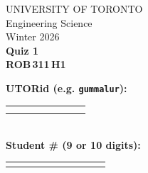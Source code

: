 \documentclass[12pt]{article}
\begin{document}
\newcommand{\spacer}{
  \vspace{5mm}\\
}

\newcommand{\hspacer}{\\
}

\noindent
\begin{minipage}{0.45\textwidth}
\large
\noindent  UNIVERSITY OF TORONTO\\
  Engineering Science\\[1.75ex]
  Winter 2026\\[1.75ex]
  \textbf{Quiz 1} \\
  \textbf{{ROB\,311\,H1}}
\end{minipage}%
\hspace{-1cm}
\begin{minipage}{0.6\textwidth}
\raggedleft
\textbf{UTORid (e.g. \texttt{gummalur}):} \\[1ex]
\begin{tabular}{|c|c|c|c|c|c|c|c|}
  \hline
  \hspace{1.2em}\; & \hspace{1.2em}\; & \hspace{1.2em}\; & \hspace{1.2em}\; & \hspace{1.2em}\; & \hspace{1.2em}\; & \hspace{1.2em}\; & \hspace{1.2em}\; \\
  \hspace{1.2em}\; & \hspace{1.2em}\; & \hspace{1.2em}\; & \hspace{1.2em}\; & \hspace{1.2em}\; & \hspace{1.2em}\; & \hspace{1.2em}\; & \hspace{1.2em}\;\\
  \hline
\end{tabular}\\[2ex]
\textbf{Student \# (9 or 10 digits):} \\[1ex]
\begin{tabular}{|c|c|c|c|c|c|c|c|c|c|}
  \hline
  \hspace{1.2em}\; & \hspace{1.2em}\; & \hspace{1.2em}\; & \hspace{1.2em}\; & \hspace{1.2em}\; & \hspace{1.2em}\; & \hspace{1.2em}\; & \hspace{1.2em}\; & \hspace{1.2em}\; & \hspace{1.2em}\; \\

\end{tabular}
\end{minipage}
\end{document}
